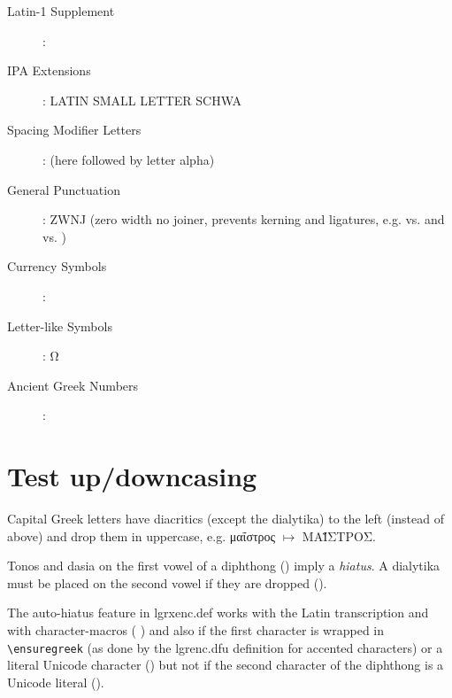 \documentclass[a4paper]{scrartcl}
\begin{document}
\begin{description}

\item [Latin-1 Supplement]: 
\item [IPA Extensions]:  LATIN SMALL LETTER SCHWA
\item [Spacing Modifier Letters]:
       (here followed by letter alpha)
\item [General Punctuation]:
       ZWNJ (zero width no joiner, prevents kerning
      and ligatures, e.g.  vs.  and
       vs. )
\item [Currency Symbols]: 
\item [Letter-like Symbols]: Ω  %
\item [Ancient Greek Numbers]: 
\end{description}

\newpage

\section{Test up/downcasing}

Capital Greek letters have diacritics (except the dialytika) to the left
(instead of above) and drop them in uppercase, e.g.
\foreignlanguage{greek}{μαΐστρος $\mapsto$ \MakeUppercase{μαΐστρος}}.

Tonos and dasia on the first vowel of a diphthong ()
imply a \emph{hiatus}. A dialytika must be placed on the second
vowel if they are dropped ().

The auto-hiatus feature in lgrxenc.def works with the Latin
transcription and with character-macros (%
)
and also if the first character is wrapped in \verb+\ensuregreek+ (as done by
the lgrenc.dfu definition for accented characters) or a literal Unicode
character
()
but not if the second character of the diphthong is a Unicode literal
().
\end{document}
